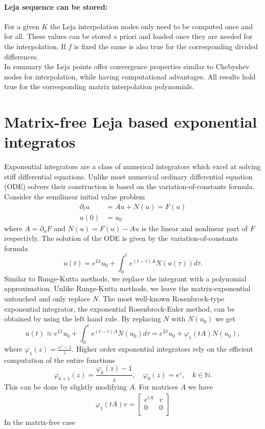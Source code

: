\documentclass{scrartcl}
\begin{document}
\paragraph{Leja sequence can be stored:}
For a given $K$ the Leja interpolation nodes only need to be computed once and for all. These values can be stored a priori and loaded once they are needed for the interpolation. If $f$ is fixed the same is also true for the corresponding divided differences. \\

In summary the Leja points offer convergence properties similar to Chebyshev nodes for interpolation, while having computational advantages. All results hold true for the corresponding matrix interpolation polynomials.

\section{Matrix-free Leja based exponential integratos}
Exponential integrators are a class of numerical integrators which excel at solving stiff differential equations. Unlike most numerical ordinary differential equation (ODE) solvers their construction is based on the variation-of-constants formula. Consider the semilinear initial value problem
\begin{align*}
	\partial_tu &= Au + N(u) = F(u) \\ 
	u(0) &= u_0
\end{align*}
where $A = \partial_uF$ and $N(u) = F(u)-Au$ is the linear and nonlinear part of $F$ respectivly. The solution of the ODE is given by the variation-of-constants formula
\[
u(t) = e^{Lt}u_0 + \int_{0}^{t}e^{(t-\tau)A}N(u(\tau))d\tau.
\]
Similar to Runge-Kutta methods, we replace the integrant with a polynomial approximation. Unlike Runge-Kutta methods, we leave the matrix-exponential untouched and only replace $N$. The most well-known Rosenbrock-type exponential integrator, the exponential Rosenbrock-Euler method, can be obtained by using the left hand rule. By replacing $N$ with $N(u_0)$ we get
\[
u(t) \approx e^{Lt}u_0 + \int_{0}^{t}e^{(t-\tau)A}N(u_0)d\tau = e^{Lt}u_0 + \varphi_1(tA)N(u_0),
\]
where $\varphi_1(z) = \frac{e^z-1}z$. Higher order exponential integrators rely on the efficient computation of the entire functions 
\[\varphi_{k+1}(z) = \frac{\varphi_k(z)-1}z, \quad \varphi_0(z) = e^z, \quad k\in\mathbb{N}.\]
This can be done by slightly modifying $A$. For matrices $A$ we have
\begin{align*}
\varphi_1(tA)v = 
\left[ \begin{array}
{rr}e^{tA}& v \\0 & 0\\
\end{array}\right]
\end{align*}
In the matrix-free case
\end{document}
